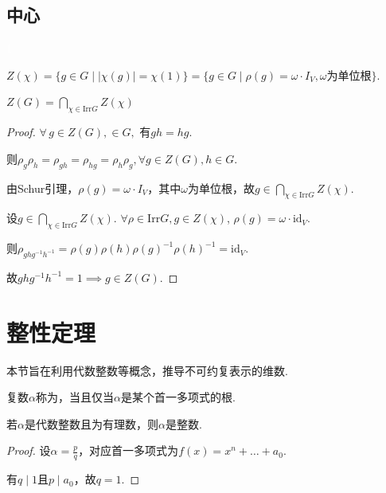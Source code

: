 \subsection*{中心}{\textcolor{white}{1}}

\begin{definition}[特征标的中心]
    $Z(\chi) = \{g \in G \mid |\chi(g)| = \chi(1)\} = \{g \in G \mid \rho(g) = \omega \cdot I_V, \omega\text{为单位根}\}$.
\end{definition}

\begin{proposition}[]
    $Z(G) = \bigcap_{\chi \in \mathrm{Irr} G} Z(\chi)$
\end{proposition}

\begin{proof}
    \fbox{$\subseteq$} $\forall\, g \in Z(G), \in G,$ 有$gh=hg$.\par
    则$\rho_g \rho_h = \rho_{gh} = \rho_{hg} = \rho_h \rho_g, \forall g \in Z(G), h \in G$.\par
    由Schur引理，$\rho(g) = \omega \cdot I_V$，其中$\omega$为单位根，故$g \in \bigcap_{\chi \in \mathrm{Irr} G} Z(\chi)$.
    
    \fbox{$\supseteq$} 设$g \in \bigcap_{\chi \in \mathrm{Irr} G} Z(\chi)$.
    $\forall \rho \in \mathrm{Irr} G, g \in Z(\chi)$, $\rho(g) = \omega \cdot \mathrm{id}_V$.\par
    则$\rho_{ghg^{-1}h^{-1}} = \rho(g) \rho(h) \rho(g)^{-1} \rho(h)^{-1} = \mathrm{id}_V$.\par
    故$ghg^{-1}h^{-1} = 1 \implies g \in Z(G)$.
\end{proof}

\section{整性定理}

本节旨在利用代数整数等概念，推导不可约复表示的维数.

\begin{definition}[代数整数]
    复数$\alpha$称为，当且仅当$\alpha$是某个首一多项式的根.
\end{definition}

\begin{lemma}[]
    若$\alpha$是代数整数且为有理数，则$\alpha$是整数.
\end{lemma}

\begin{proof}
    设$\alpha = \frac{p}{q}$，对应首一多项式为$f(x) = x^n + \dots + a_0$.\par
    有$q \mid 1$且$p \mid a_0$，故$q=1$.
\end{proof}

